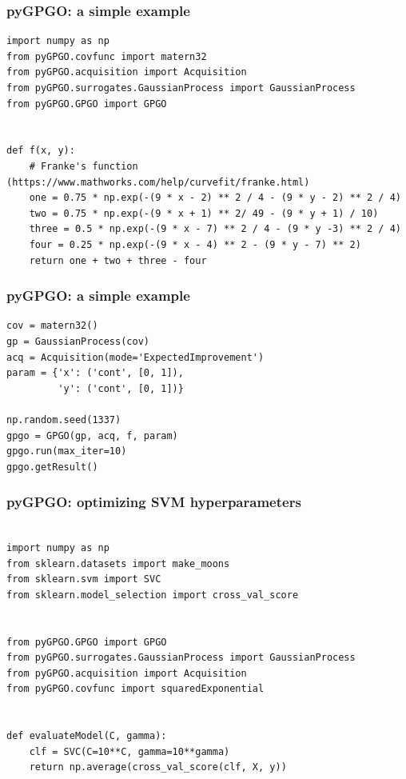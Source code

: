 \documentclass[10pt,usenames,dvipsnames]{beamer}
\begin{document}
\begin{frame}[fragile]
\frametitle{pyGPGO: a simple example}
\begin{verbatim}
import numpy as np
from pyGPGO.covfunc import matern32
from pyGPGO.acquisition import Acquisition
from pyGPGO.surrogates.GaussianProcess import GaussianProcess
from pyGPGO.GPGO import GPGO


def f(x, y):
    # Franke's function (https://www.mathworks.com/help/curvefit/franke.html)
    one = 0.75 * np.exp(-(9 * x - 2) ** 2 / 4 - (9 * y - 2) ** 2 / 4)
    two = 0.75 * np.exp(-(9 * x + 1) ** 2/ 49 - (9 * y + 1) / 10)
    three = 0.5 * np.exp(-(9 * x - 7) ** 2 / 4 - (9 * y -3) ** 2 / 4)
    four = 0.25 * np.exp(-(9 * x - 4) ** 2 - (9 * y - 7) ** 2)
    return one + two + three - four
\end{verbatim}
\end{frame}

\begin{frame}[fragile]
\frametitle{pyGPGO: a simple example}
\begin{verbatim}
cov = matern32()
gp = GaussianProcess(cov)
acq = Acquisition(mode='ExpectedImprovement')
param = {'x': ('cont', [0, 1]),
         'y': ('cont', [0, 1])}

np.random.seed(1337)
gpgo = GPGO(gp, acq, f, param)
gpgo.run(max_iter=10)
gpgo.getResult()
\end{verbatim}
\end{frame}

\begin{frame}[fragile]
\frametitle{pyGPGO: optimizing SVM hyperparameters}
\begin{verbatim}

import numpy as np
from sklearn.datasets import make_moons
from sklearn.svm import SVC
from sklearn.model_selection import cross_val_score


from pyGPGO.GPGO import GPGO
from pyGPGO.surrogates.GaussianProcess import GaussianProcess
from pyGPGO.acquisition import Acquisition
from pyGPGO.covfunc import squaredExponential


def evaluateModel(C, gamma):
    clf = SVC(C=10**C, gamma=10**gamma)
    return np.average(cross_val_score(clf, X, y))
               
\end{verbatim}
\end{frame}
\end{document}
